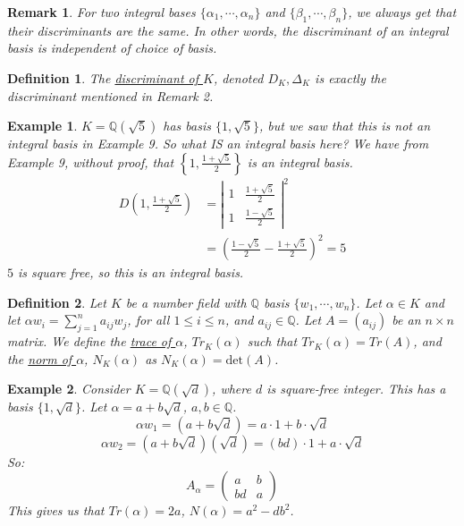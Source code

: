 \documentclass{article}
\newcommand{\Q}{\mathbb{Q}}
\newtheorem{remark}{Remark}[subsection]
\newtheorem{example}{Example}[subsection]
\newtheorem{definition}{Definition}[subsection]
\begin{document}
\begin{remark}
For two integral bases $\{\alpha_1,\cdots,\alpha_n\}$ and $\{\beta_1,\cdots,\beta_n\}$, we always get that their discriminants are the same. In other words, the discriminant of an integral basis is independent of choice of basis. 
\end{remark}
\begin{definition}
The \underline{discriminant of $K$}, denoted $D_K,\Delta_K$ is exactly the discriminant mentioned in Remark 2.
\end{definition}
\begin{example}
$K=\Q(\sqrt{5})$ has basis $\{1,\sqrt{5}\}$, but we saw that this is not an integral basis in Example 9. So what IS an integral basis here? We have from Example 9, without proof, that $\left\{1,\frac{1+\sqrt{5}}{2}\right\}$ is an integral basis.
\begin{align*}
    D\left(1,\frac{1+\sqrt{5}}{2}\right)&=\left|\begin{array}{cc}
        1 & \frac{1+\sqrt{5}}{2} \\
        1 & \frac{1-\sqrt{5}}{2}
    \end{array}\right|^2\\
    &=\left(\frac{1-\sqrt{5}}{2}-\frac{1+\sqrt{5}}{2}\right)^2=5
\end{align*}
$5$ is square free, so this is an integral basis.
\end{example}
\begin{definition}
Let $K$ be a number field with $\Q$ basis $\{w_1,\cdots, w_n\}$. Let $\alpha\in K$ and let $\alpha w_i=\displaystyle\sum_{j=1}^na_{ij}w_j$, for all $1\leq i\leq n$, and $a_{ij}\in\Q$. Let $A=(a_{ij})$ be an $n\times n$ matrix.
We define the \underline{trace of $\alpha$}, $Tr_K(\alpha)$ such that $Tr_K(\alpha)=Tr(A)$, and the \underline{norm of $\alpha$}, $N_K(\alpha)$ as $N_K(\alpha)=\text{det}(A)$.
\end{definition}
\begin{example}
Consider $K=\Q(\sqrt{d})$, where $d$ is square-free integer. This has a basis $\{1,\sqrt{d}\}$. Let $\alpha=a+b\sqrt{d}$, $a,b\in\Q$.
$$\alpha w_1=(a+b\sqrt{d})=a\cdot 1 + b\cdot \sqrt{d}$$
$$\alpha w_2=(a+b\sqrt{d})(\sqrt{d})=(bd)\cdot 1 + a\cdot\sqrt{d}$$
So:
$$A_\alpha = \begin{pmatrix}a & b\\ bd & a\end{pmatrix}$$
This gives us that $Tr(\alpha)=2a$, $N(\alpha)=a^2-db^2$.
\end{example}
\newpage
\end{document}
